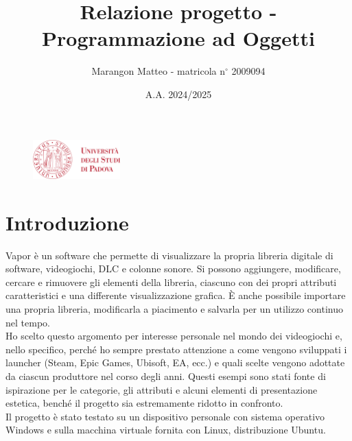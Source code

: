 \documentclass[10pt]{article}
\title{Relazione progetto - Programmazione ad Oggetti}
\author{Marangon Matteo - matricola n$^{\circ}$ 2009094}
\date{A.A. 2024/2025}
\begin{document}
\begin{figure}
    \centering
    \includegraphics[width=0.3\textwidth]{./unipdlogo.png}
\end{figure}
\maketitle

\newpage

\tableofcontents  %
\newpage

\section{Introduzione} %
Vapor è un software che permette di visualizzare la propria libreria digitale di software, videogiochi, DLC e colonne sonore. Si possono aggiungere, modificare, cercare e rimuovere gli elementi della libreria, ciascuno con dei propri attributi caratteristici e una differente visualizzazione grafica. È anche possibile importare una propria libreria, modificarla a piacimento e salvarla per un utilizzo continuo nel tempo.
\\Ho scelto questo argomento per interesse personale nel mondo dei videogiochi e, nello specifico, perché ho sempre prestato attenzione a come vengono sviluppati i launcher (Steam, Epic Games, Ubisoft, EA, ecc.) e quali scelte vengono adottate da ciascun produttore nel corso degli anni. Questi esempi sono stati fonte di ispirazione per le categorie, gli attributi e alcuni elementi di presentazione estetica, benché il progetto sia estremamente ridotto in confronto.
\\Il progetto è stato testato su un dispositivo personale con sistema operativo Windows e sulla macchina virtuale fornita con Linux, distribuzione Ubuntu.
\end{document}
